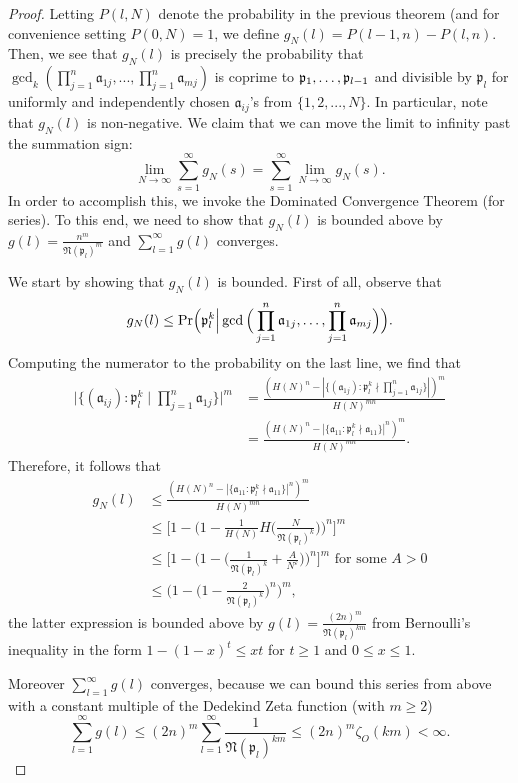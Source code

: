 \documentclass[12pt]{amsart}
\theoremstyle{definition}
\newcommand{\f}[1]{\mathfrak{#1}}
\begin{document}
\begin{proof}
Letting $P(l, N)$ denote the probability in the previous theorem (and for convenience setting $P(0, N) = 1$, we define $g_N(l) = P(l-1, n) - P(l, n)$. Then, we see that $g_N(l)$ is precisely the probability that $\gcd_k(\prod_{j=1}^n \f{a}_{1j}, ... , \prod_{j=1}^n \f{a}_{mj})$ is coprime to $\f{p}_1, \mathellipsis, \f{p}_{l-1}$ and divisible by $\f{p}_l$ for uniformly and independently chosen $\f{a}_{ij}$'s from $\{1, 2, ..., N\}$. In particular, note that $g_N(l)$ is non-negative. We claim that we can move the limit to infinity past the summation sign:
$$\lim_{N \to \infty} \sum_{s=1}^{\infty} g_N(s) = \sum_{s=1}^{\infty} \lim_{N \to \infty} g_N(s).$$
In order to accomplish this, we invoke the Dominated Convergence Theorem (for series). To this end, we need to show that $g_N(l)$ is bounded above by $g(l) = \frac{n^m}{\f{N}(\f{p}_{l})^{m}}$ and $\sum_{l=1}^{\infty} g(l)$ converges.

We start by showing that $g_N(l)$ is bounded. First of all, observe that
$$g_N(l) \leq \text{Pr}\Big(\f{p}_l^k \Big| \gcd\Big(\prod_{j=1}^n \f{a}_{1j}, \mathellipsis, \prod_{j=1}^n \f{a}_{mj}\Big)\Big).$$
Computing the numerator to the probability on the last line, we find that
\begin{align*} 
	\Big|\{(\f{a}_{ij}) : \f{p}_l^k \mid \prod_{j=1}^n \f{a}_{1j}\}\Big|^m &= \frac{(H(N)^n - |\{(\f{a}_{1j}) : \f{p}_l^k \nmid \prod_{j=1}^n \f{a}_{1j}\}|)^m}{H(N)^{mn}}\\
	&= \frac{(H(N)^n - |\{\f{a}_{11} : \f{p}_l^k \nmid \f{a}_{11}\}|^n)^m}{H(N)^{mn}}. \end{align*}
Therefore, it follows that
\begin{align*} 
	g_N(l) &\leq \frac{(H(N)^n - |\{\f{a}_{11} : \f{p}_l^k \nmid \f{a}_{11}\}|^n)^m}{H(N)^{mn}}\\
	&\leq \Big[1 - \Big(1 - \frac{1}{H(N)}  H\Big(\frac{N}{\f{N}(\f{p}_l)^k}\Big)\Big)^n\Big]^m\\
	&\leq \Big[1 - \Big(1 - \Big(\frac{1}{\f{N}(\f{p}_l)^k}+\frac{A}{N^{\varepsilon}}\Big)\Big)^n\Big]^m \text{ for some } A>0\\
	&\leq \Big(1 - \Big(1 - \frac{2}{\f{N}(\f{p}_l)^k}\Big)^n \Big)^m,
\end{align*}
the latter expression is bounded above by $g(l)=\frac{(2n)^m}{\f{N}(\f{p}_l)^{km}}$ from Bernoulli's inequality in the form $1-(1-x)^t\leq xt$ for $t\geq 1$ and $0\leq x \leq 1$.

 Moreover $\sum_{l=1}^{\infty} g(l)$ converges, because we can bound this series from above with a constant multiple of the Dedekind Zeta function (with $m\geq 2$) $$ \sum_{l=1}^{\infty}g(l)\leq(2n)^m\sum_{l=1}^{\infty}\frac{1}{\f{N}(\f{p}_l)^{km}}\leq (2n)^m\zeta_O(km)< \infty.$$


\end{proof}
\end{document}
